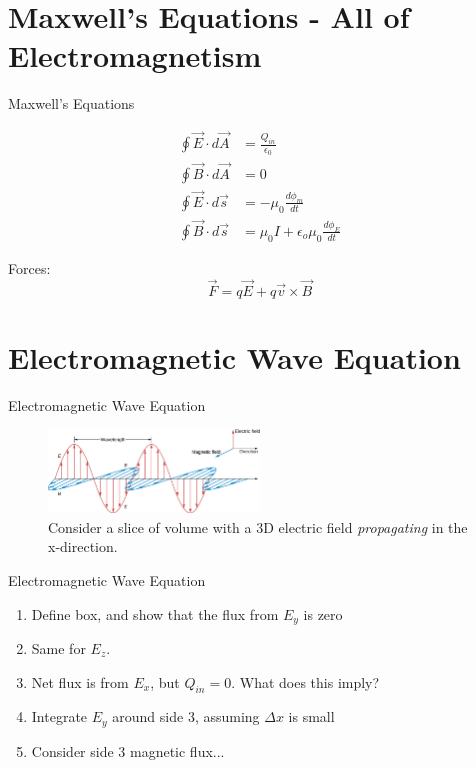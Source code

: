 \documentclass{beamer}
\begin{document}
\section{Maxwell's Equations - All of Electromagnetism}

\begin{frame}{Maxwell's Equations}
\begin{tcolorbox}[colback=white,colframe=black!100!black,title=Maxwell's Equations]
\begin{align}
\oint \vec{E} \cdot d\vec{A} &= \frac{Q_{in}}{\epsilon_0} \\
\oint \vec{B} \cdot d\vec{A} &= 0 \\
\oint \vec{E} \cdot d\vec{s} &= -\mu_0 \frac{d\phi_m}{dt} \\
\oint \vec{B} \cdot d\vec{s} &= \mu_0 I + \epsilon_o \mu_0 \frac{d\phi_E}{dt}
\end{align}
\end{tcolorbox}
Forces:
\begin{equation}
\vec{F} = q \vec{E} + q\vec{v} \times \vec{B}
\end{equation}
\end{frame}

\section{Electromagnetic Wave Equation}

\begin{frame}{Electromagnetic Wave Equation}
\begin{figure}
\centering
\includegraphics[width=0.5\textwidth]{figures/wave1.jpeg}
\caption{\label{fig:wave1} Consider a slice of volume with a 3D electric field \textit{propagating} in the x-direction.}
\end{figure}
\end{frame}

\begin{frame}{Electromagnetic Wave Equation}
\begin{enumerate}
\item Define box, and show that the flux from $E_y$ is zero
\item Same for $E_z$.
\item Net flux is from $E_x$, but $Q_{in} = 0$.  What does this imply?
\item Integrate $E_y$ around side 3, assuming $\Delta x$ is small
\item Consider side 3 magnetic flux... 
\end{enumerate}
\end{frame}
\end{document}
